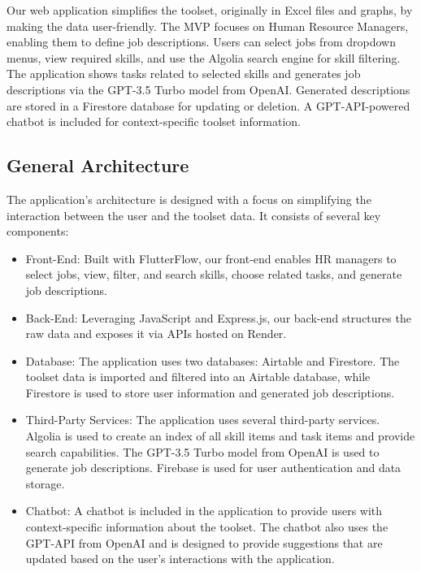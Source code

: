 
Our web application simplifies the  toolset, originally in Excel files and graphs, by making the data user-friendly. The MVP focuses on Human Resource Managers, enabling them to define job descriptions. Users can select jobs from dropdown menus, view required skills, and use the Algolia search engine for skill filtering. The application shows tasks related to selected skills and generates job descriptions via the GPT-3.5 Turbo model from OpenAI. Generated descriptions are stored in a Firestore database for updating or deletion. A GPT-API-powered chatbot is included for context-specific  toolset information.


\subsection{General Architecture}

The application's architecture is designed with a focus on simplifying the interaction between the user and the  toolset data. It consists of several key components:

\begin{itemize}
    \item Front-End: Built with FlutterFlow, our front-end enables HR managers to select jobs, view, filter, and search skills, choose related tasks, and generate job descriptions.
    \item Back-End: Leveraging JavaScript and Express.js, our back-end structures the raw  data and exposes it via APIs hosted on Render.
    \item Database: The application uses two databases: Airtable and Firestore. The  toolset data is imported and filtered into an Airtable database, while Firestore is used to store user information and generated job descriptions.
    \item Third-Party Services: The application uses several third-party services. Algolia is used to create an index of all skill items and task items and provide search capabilities. The GPT-3.5 Turbo model from OpenAI is used to generate job descriptions. Firebase is used for user authentication and data storage.
    \item Chatbot: A chatbot is included in the application to provide users with context-specific information about the  toolset. The chatbot also uses the GPT-API from OpenAI and is designed to provide suggestions that are updated based on the user's interactions with the application.
\end{itemize}



